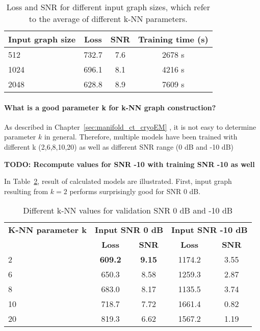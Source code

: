   \begin{table}[H]
    \centering
      \begin{tabular}{l|ccc}
      \toprule
      \textbf{Input graph size} & \textbf{Loss} & \textbf{SNR} & \textbf{Training time (s)}  \\ 
      \midrule
      512  &  732.7    &  7.6  & 2678 s \\ \hline
      1024 &  696.1    &  8.1  & 4216 s \\ \hline
      2048 &  628.8    &  8.9  & 7609 s  \\ \hline
      \midrule
      \end{tabular}
    \caption{Loss and SNR for different input graph sizes, which refer to the average of different k-NN parameters.}
    \label{tab:graph_knn}
  \end{table}

  \paragraph{What is a good parameter k for k-NN graph construction?}

  As described in Chapter~\ref{sec:manifold_ct_cryoEM} \textit{},
  it is not easy to determine parameter $k$ in general.
  Therefore, multiple models have been trained with different k (2,6,8,10,20)
  as well as different SNR range (0 dB and -10 dB)


  \textbf{TODO: Recompute values for SNR -10 with training SNR -10 as well }

  In Table~\ref{tab:small_knn_snr}, result of calculated models are illustrated.
  First, input graph resulting from $k=2$ performs surprisingly good for SNR 0 dB.

  \begin{table}[H]
    \centering
    \begin{tabular}{l|cc|cc}
      \toprule
      \textbf{K-NN parameter k} & \multicolumn{2}{l|}{\footnotesize \textbf{Input SNR 0 dB}} & \multicolumn{2}{l|}{\footnotesize \textbf{Input SNR -10 dB}}  \\
                         & \textbf{Loss} & \textbf{SNR} & \textbf{Loss} & \textbf{SNR} \\ 
      \midrule
      2    &  \textbf{609.2}  &  \textbf{9.15}  & 1174.2 & 3.55   \\ \hline
      6    &  650.3           &   8.58          & 1259.3 & 2.87   \\ \hline
      8    &  683.0           &   8.17          & 1135.5 & 3.74   \\ \hline
      10   &  718.7           &   7.72          & 1661.4 & 0.82   \\ \hline
      20   &  819.3           &   6.62          & 1567.2 & 1.19   \\  
      \midrule
    \end{tabular}
  
    \caption{Different k-NN values for validation SNR 0 dB and -10 dB }
    \label{tab:small_knn_snr}
  \end{table}


